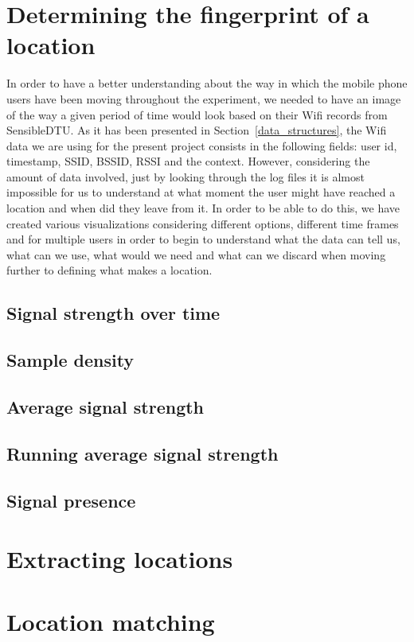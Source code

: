 \section{Determining the fingerprint of a location}
In order to have a better understanding about the way in which the mobile phone
users have been moving throughout the experiment, we needed to have an image of
the way a given period of time would look based on their Wifi records from
SensibleDTU. As it has been presented in Section~\ref{data_structures}, the Wifi
data we are using for the present project consists in the following fields:
user id, timestamp, SSID, BSSID, RSSI and the context. However, considering the
amount of data involved, just by looking through the log files it is almost
impossible for us to understand at what moment the user might have reached a
location and when did they leave from it. In order to be able to do this, we
have created various visualizations considering different options, different
time frames and for multiple users in order to begin to understand what the data
can tell us, what can we use, what would we need and what can we discard when
moving further to defining what makes a location.

\subsection{Signal strength over time}
\subsection{Sample density}
\subsection{Average signal strength}
\subsection{Running average signal strength}
\subsection{Signal presence}

\section{Extracting locations}
\section{Location matching}


